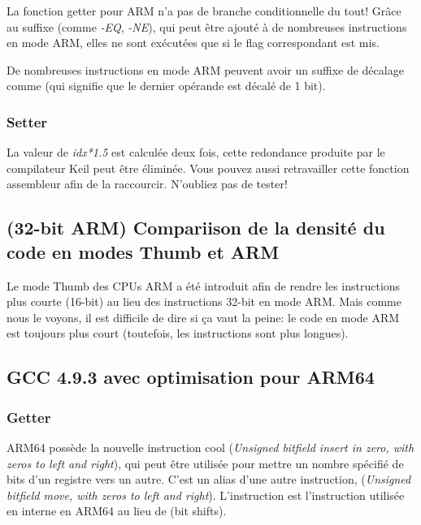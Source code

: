 La fonction getter pour ARM n'a pas de branche conditionnelle du tout!
Grâce au suffixe (comme \emph{-EQ}, \emph{-NE}), qui peut être ajouté à de nombreuses
instructions en mode ARM, elles ne sont exécutées que si le flag correspondant est
mis.

De nombreuses instructions en mode ARM peuvent avoir un suffixe de décalage comme
 (qui signifie que le dernier opérande est décalé de 1 bit).



\subsubsection{Setter}



La valeur de \emph{idx*1.5} est calculée deux fois, cette redondance produite par le
compilateur Keil peut être éliminée.
Vous pouvez aussi retravailler cette fonction assembleur afin de la raccourcir. N'oubliez
pas de tester!

\subsection{(32-bit ARM) Compariison de la densité du code en modes Thumb et ARM}

Le mode Thumb des CPUs ARM a été introduit afin de rendre les instructions plus courte
(16-bit) au lieu des instructions 32-bit en mode ARM.
Mais comme nous le voyons, il est difficile de dire si ça vaut la peine: le code en
mode ARM est toujours plus court (toutefois, les instructions sont plus longues).

\subsection{GCC 4.9.3 avec optimisation pour ARM64}

\subsubsection{Getter}



ARM64 possède la nouvelle instruction cool  (\emph{Unsigned bitfield insert
in zero, with zeros to left and right}), qui peut être utilisée pour mettre un nombre
spécifié de bits d'un registre vers un autre.
C'est un alias d'une autre instruction,  (\emph{Unsigned bitfield move, with
 zeros to left and right}).
L'instruction  est l'instruction utilisée en interne en ARM64 au lieu de
 (bit shifts).

